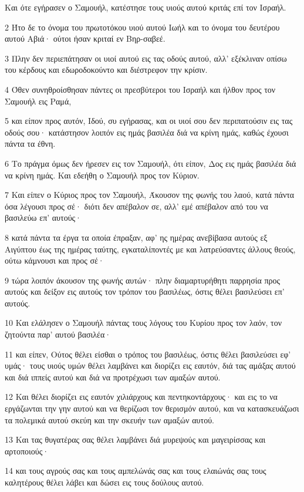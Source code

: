 \par Και ότε εγήρασεν ο Σαμουήλ, κατέστησε τους υιούς αυτού κριτάς επί τον Ισραήλ.
\par 2 Ήτο δε το όνομα του πρωτοτόκου υιού αυτού Ιωήλ και το όνομα του δευτέρου αυτού Αβιά· ούτοι ήσαν κριταί εν Βηρ-σαβεέ.
\par 3 Πλην δεν περιεπάτησαν οι υιοί αυτού εις τας οδούς αυτού, αλλ' εξέκλιναν οπίσω του κέρδους και εδωροδοκούντο και διέστρεφον την κρίσιν.
\par 4 Όθεν συνηθροίσθησαν πάντες οι πρεσβύτεροι του Ισραήλ και ήλθον προς τον Σαμουήλ εις Ραμά,
\par 5 και είπον προς αυτόν, Ιδού, συ εγήρασας, και οι υιοί σου δεν περιπατούσιν εις τας οδούς σου· κατάστησον λοιπόν εις ημάς βασιλέα διά να κρίνη ημάς, καθώς έχουσι πάντα τα έθνη.
\par 6 Το πράγμα όμως δεν ήρεσεν εις τον Σαμουήλ, ότι είπον, Δος εις ημάς βασιλέα διά να κρίνη ημάς. Και εδεήθη ο Σαμουήλ προς τον Κύριον.
\par 7 Και είπεν ο Κύριος προς τον Σαμουήλ, Άκουσον της φωνής του λαού, κατά πάντα όσα λέγουσι προς σέ· διότι δεν απέβαλον σε, αλλ' εμέ απέβαλον από του να βασιλεύω επ' αυτούς·
\par 8 κατά πάντα τα έργα τα οποία έπραξαν, αφ' ης ημέρας ανεβίβασα αυτούς εξ Αιγύπτου έως της ημέρας ταύτης, εγκαταλίποντές με και λατρεύσαντες άλλους θεούς, ούτω κάμνουσι και προς σέ·
\par 9 τώρα λοιπόν άκουσον της φωνής αυτών· πλην διαμαρτυρήθητι παρρησία προς αυτούς και δείξον εις αυτούς τον τρόπον του βασιλέως, όστις θέλει βασιλεύσει επ' αυτούς.
\par 10 Και ελάλησεν ο Σαμουήλ πάντας τους λόγους του Κυρίου προς τον λαόν, τον ζητούντα παρ' αυτού βασιλέα·
\par 11 και είπεν, Ούτος θέλει είσθαι ο τρόπος του βασιλέως, όστις θέλει βασιλεύσει εφ' υμάς· τους υιούς υμών θέλει λαμβάνει και διορίζει εις εαυτόν, διά τας αμάξας αυτού και διά ιππείς αυτού και διά να προτρέχωσι των αμαξών αυτού.
\par 12 Και θέλει διορίζει εις εαυτόν χιλιάρχους και πεντηκοντάρχους· και εις το να εργάζωνται την γην αυτού και να θερίζωσι τον θερισμόν αυτού, και να κατασκευάζωσι τα πολεμικά αυτού σκεύη και την σκευήν των αμαξών αυτού.
\par 13 Και τας θυγατέρας σας θέλει λαμβάνει διά μυρεψούς και μαγειρίσσας και αρτοποιούς·
\par 14 και τους αγρούς σας και τους αμπελώνάς σας και τους ελαιώνάς σας τους καλητέρους θέλει λάβει και δώσει εις τους δούλους αυτού.
